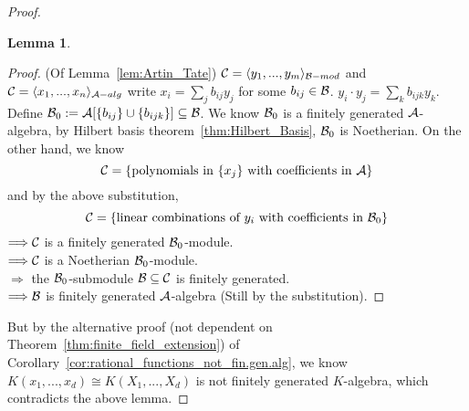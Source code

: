 \documentclass[11pt]{article}
\newtheorem{lemma}[thm]{Lemma}
\newcommand{\cala}{{\cal A}}
\newcommand{\calb}{{\cal B}}
\newcommand{\calc}{{\cal C}}
\newcommand{\Lrta}{\Longrightarrow}
\newcommand{\lgl}{\langle}
\newcommand{\rgl}{\rangle}
\begin{document}
\begin{proof}
\begin{lemma}
\end{lemma}
\begin{proof}
(Of Lemma~\ref{lem:Artin_Tate}) $\calc=\lgl y_1,...,y_m\rgl_{\calb-mod}$ and $\calc=\lgl x_1,...,x_n\rgl_{\cala-alg}$ write $x_i=\sum_j b_{ij} y_j$ for some $b_{ij}\in \calb$. $y_i\cdot y_j=\sum_k b_{ijk}y_k$. Define $\calb_0:=\cala[\{b_{ij}\}\cup \{b_{ijk}\}]\subseteq \calb$. We know $\calb_0$ is a finitely generated $\cala$-algebra, by Hilbert basis theorem~\ref{thm:Hilbert_Basis}, $\calb_0$ is Noetherian. On the other hand, we know
$$
\calc=\{\text{polynomials in } \{x_{j}\}\text{ with coefficients in }\cala\}
$$ 
and by the above substitution,
$$
\calc=\{\text{linear combinations of}\text{ $y_i$ with coefficients in $\calb_0$}\}$$
 $\Lrta \calc$ is a finitely generated $\calb_0$-module.\\
$\Lrta \calc$ is a Noetherian $\calb_0$-module.\\
$\Lrta$ the $\calb_0$-submodule $\calb\subseteq \calc$ is finitely generated.\\
$\Lrta\calb$ is finitely generated $\cala$-algebra (Still by the substitution).
\end{proof}
But by the alternative proof (not dependent on Theorem~\ref{thm:finite_field_extension}) of Corollary~\ref{cor:rational_functions_not_fin.gen.alg}, we know  $K(x_1,...,x_d)\cong K(X_1,...,X_d)$ is not finitely generated $K$-algebra, which contradicts the above lemma.
\end{proof}
\end{document}
